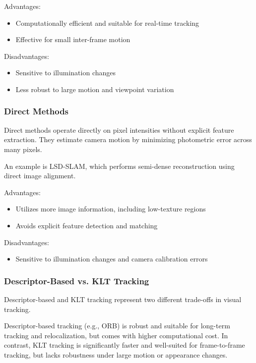 \documentclass[english, cd=nocolor, cdfont=off, fontsize=11pt]{tudscrreprt}
\begin{document}
Advantages:
\begin{itemize}
    \item Computationally efficient and suitable for real-time tracking
    \item Effective for small inter-frame motion
\end{itemize}

Disadvantages:
\begin{itemize}
    \item Sensitive to illumination changes
    \item Less robust to large motion and viewpoint variation
\end{itemize}

\subsubsection{Direct Methods}

Direct methods operate directly on pixel intensities without explicit feature extraction. They estimate camera motion by minimizing photometric error across many pixels.

An example is LSD-SLAM, which performs semi-dense reconstruction using direct image alignment.

Advantages:
\begin{itemize}
    \item Utilizes more image information, including low-texture regions
    \item Avoids explicit feature detection and matching
\end{itemize}

Disadvantages:
\begin{itemize}
    \item Sensitive to illumination changes and camera calibration errors
\end{itemize}

\subsubsection{Descriptor-Based vs. KLT Tracking}

Descriptor-based and KLT tracking represent two different trade-offs in visual tracking.

Descriptor-based tracking (e.g., ORB) is robust and suitable for long-term tracking and relocalization, but comes with higher computational cost. In contrast, KLT tracking is significantly faster and well-suited for frame-to-frame tracking, but lacks robustness under large motion or appearance changes.
\end{document}
